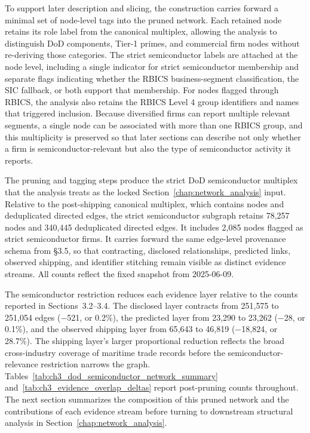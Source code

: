 To support later description and slicing, the construction carries forward a minimal set of node-level tags into the pruned network. Each retained node retains its role label from the canonical multiplex, allowing the analysis to distinguish DoD components, Tier-1 primes, and commercial firm nodes without re-deriving those categories. The strict semiconductor labels are attached at the node level, including a single indicator for strict semiconductor membership and separate flags indicating whether the RBICS business-segment classification, the SIC fallback, or both support that membership. For nodes flagged through RBICS, the analysis also retains the RBICS Level 4 group identifiers and names that triggered inclusion. Because diversified firms can report multiple relevant segments, a single node can be associated with more than one RBICS group, and this multiplicity is preserved so that later sections can describe not only whether a firm is semiconductor-relevant but also the type of semiconductor activity it reports.

The pruning and tagging steps produce the strict DoD semiconductor multiplex that the analysis treats as the locked Section~\ref{chap:network_analysis} input. Relative to the post-shipping canonical multiplex, which contains \PostShipNodes nodes and \PostShipEdges deduplicated directed edges, the strict semiconductor subgraph retains 78{,}257 nodes and 340{,}445 deduplicated directed edges. It includes 2{,}085 nodes flagged as strict semiconductor firms. It carries forward the same edge-level provenance schema from \S3.5, so that contracting, disclosed relationships, predicted links, observed shipping, and identifier stitching remain visible as distinct evidence streams. All counts reflect the fixed snapshot from 2025-06-09.

The semiconductor restriction reduces each evidence layer relative to the counts reported in Sections~3.2--3.4. The disclosed layer contracts from 251{,}575 to 251{,}054 edges ($-$521, or 0.2\%), the predicted layer from 23{,}290 to 23{,}262 ($-$28, or 0.1\%), and the observed shipping layer from 65{,}643 to 46{,}819 ($-$18{,}824, or 28.7\%). The shipping layer's larger proportional reduction reflects the broad cross-industry coverage of maritime trade records before the semiconductor-relevance restriction narrows the graph. Tables~\ref{tab:ch3_dod_semiconductor_network_summary} and~\ref{tab:ch3_evidence_overlap_deltas} report post-pruning counts throughout. The next section summarizes the composition of this pruned network and the contributions of each evidence stream before turning to downstream structural analysis in Section~\ref{chap:network_analysis}.

